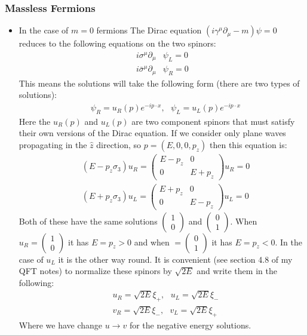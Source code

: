 \documentclass[11pt]{article}
\numberwithin{equation}{section}
\begin{document}
\subsubsection{Massless Fermions} %
\label{ssub:massless_fermions}
\begin{itemize}
    \item In the case of $m=0$ fermions The Dirac equation $(i\gamma^{\mu}\partial_{\mu}-m)\psi = 0$ reduces to the following equations on the two spinors:
    \begin{align*}
         i\sigma^{\mu}\partial_{\mu}&\psi_{L} = 0 \\
      i\bar{\sigma}^{\mu}\partial_{\mu}& \psi_{R} =0 
    \end{align*}
    This means the solutions will take the following form (there are two types of solutions):
    \begin{align}
    \label{spinor_ansatz}
        &\psi_{R} = u_{R}(p)e^{-ip \cdot x}, ~~~ \psi_{L} = u_{L}(p)e^{-ip \cdot x}
    \end{align}
    Here the $u_R(p)$ and $u_L(p)$  are two component spinors that must satisfy their own versions of the Dirac equation. If we consider only plane waves propagating in the $\hat{z}$ direction, so $p = (E,0,0,p_z)$ then this equation is:
    \begin{align*}
         & (E-p_z\sigma_3)u_R = \begin{pmatrix}
             E-p_z & 0  \\
             0 & E+ p_z
         \end{pmatrix}u_R = 0  \\
         & (E+p_z\sigma_3)u_L = \begin{pmatrix}
             E+p_z & 0  \\
             0 & E- p_z
         \end{pmatrix}u_L = 0  
     \end{align*} 
     Both of these have the same solutions $\begin{pmatrix}
         1 \\ 0
     \end{pmatrix}$ and $\begin{pmatrix}
         0 \\ 1
     \end{pmatrix}$. When $u_R = \begin{pmatrix}
         1 \\ 0
     \end{pmatrix}$ it has $E = p_z >0$ and when $ = \begin{pmatrix}
         0 \\ 1
     \end{pmatrix}$ it has $E = p_z<0$. In the case of $u_L$ it is the other way round. It is convenient (see section 4.8 of my QFT notes) to normalize these spinors by $\sqrt{2E}$ and write them in the following:
     \begin{align*}
          & u_R = \sqrt{2E}\xi_+, ~~~u_L = \sqrt{2E}\xi_- \\
          & v_R = \sqrt{2E}\xi_-, ~~~v_L = \sqrt{2E}\xi_+
      \end{align*}    
      Where we have change $u \rightarrow v$ for the negative energy solutions. 


\end{itemize}
\end{document}
